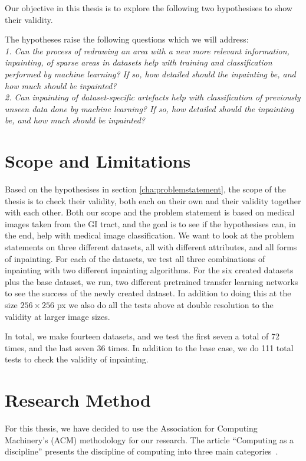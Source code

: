 Our objective in this thesis is to explore the following two hypothesises to show their validity.

The hypotheses raise the following questions which we will address:\\

\textit{1. Can the process of redrawing an area with a new more relevant information, inpainting, of sparse areas in datasets help with training and classification performed by machine learning? If so, how detailed should the inpainting be, and how much should be inpainted?}\\

\textit{2. Can inpainting of dataset-specific artefacts help with classification of previously unseen data done by machine learning? If so, how detailed should the inpainting be, and how much should be inpainted?}


\section{Scope and Limitations}
Based on the hypothesises in section \ref{cha:problemstatement}, the scope of the thesis is to check their validity, both each on their own and their validity together with each other. 
Both our scope and the problem statement is based on medical images taken from the GI tract, and the goal is to see if the hypothesises can, in the end, help with medical image classification.
We want to look at the problem statements on three different datasets, all with different attributes, and all forms of inpainting.
For each of the datasets, we test all three combinations of inpainting with two different inpainting algorithms. 
For the six created datasets plus the base dataset, we run, two different pretrained transfer learning networks to see the success of the newly created dataset.
In addition to doing this at the size $256 \times 256$ px we also do all the tests above at double resolution to the validity at larger image sizes.

In total, we make fourteen datasets, and we test the first seven a total of 72 times, and the last seven 36 times. In addition to the base case, we do 111 total tests to check the validity of inpainting.



\section{Research Method}
For this thesis, we have decided to use the Association for Computing Machinery's (ACM) methodology for our research. The article ``Computing as a discipline'' presents the discipline of computing into three main categories~\cite{Denning:1989:CD:63238.63239}. 
